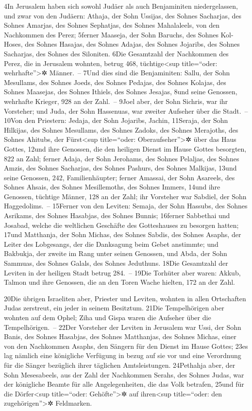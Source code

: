 4In Jerusalem haben sich sowohl Judäer als auch Benjaminiten
niedergelassen, und zwar von den Judäern: Athaja, der Sohn Ussijas, des
Sohnes Sacharjas, des Sohnes Amarjas, des Sohnes Sephatjas, des Sohnes
Mahalaleels, von den Nachkommen des Perez; 5ferner Maaseja, der Sohn
Baruchs, des Sohnes Kol-Hoses, des Sohnes Hasajas, des Sohnes Adajas,
des Sohnes Jojaribs, des Sohnes Sacharjas, des Sohnes des Siloniten.
6Die Gesamtzahl der Nachkommen des Perez, die in Jerusalem wohnten,
betrug 468, tüchtige\textless sup title=``oder: wehrhafte''\textgreater✲
Männer.~-- 7Und dies sind die Benjaminiten: Sallu, der Sohn Mesullams,
des Sohnes Joeds, des Sohnes Pedajas, des Sohnes Kolajas, des Sohnes
Maasejas, des Sohnes Ithiels, des Sohnes Jesajas, 8und seine Genossen,
wehrhafte Krieger, 928 an der Zahl.~-- 9Joel aber, der Sohn Sichris, war
ihr Vorsteher; und Juda, der Sohn Hassenuas, war zweiter Aufseher über
die Stadt.~-- 10Von den Priestern: Jedaja, der Sohn Jojaribs, Jachin,
11Seraja, der Sohn Hilkijas, des Sohnes Mesullams, des Sohnes Zadoks,
des Sohnes Merajoths, des Sohnes Ahitubs, der Fürst\textless sup
title=``oder: Oberaufseher''\textgreater✲ über das Haus Gottes, 12und
ihre Genossen, die den heiligen Dienst im Hause Gottes besorgten, 822 an
Zahl; ferner Adaja, der Sohn Jerohams, des Sohnes Pelaljas, des Sohnes
Amzis, des Sohnes Sacharjas, des Sohnes Pashurs, des Sohnes Malkijas,
13und seine Genossen, 242, Familienhäupter; ferner Amassai, der Sohn
Asareels, des Sohnes Ahsais, des Sohnes Mesillemoths, des Sohnes Immers,
14und ihre Genossen, tüchtige Männer, 128 an der Zahl; ihr Vorsteher war
Sabdiel, der Sohn Haggedolims.~-- 15Ferner von den Leviten: Semaja, der
Sohn Hassubs, des Sohnes Asrikams, des Sohnes Hasabjas, des Sohnes
Bunnis; 16ferner Sabbethai und Josabad, welche die weltlichen Geschäfte
des Gotteshauses zu besorgen hatten; 17und Matthanja, der Sohn Michas,
des Sohnes Sabdis, des Sohnes Asaphs, der Leiter des Lobgesangs, der die
Danksagung beim Gebet anstimmte; und Bakbukja, der zweite im Rang unter
seinen Genossen, und Abda, der Sohn Sammuas, des Sohnes Galals, des
Sohnes Jeduthuns. 18Die Gesamtzahl der Leviten in der heiligen Stadt
betrug 284.~-- 19Die Torhüter aber waren: Akkub, Talmon und ihre
Genossen, die an den Toren Wache hielten, 172 an der Zahl.

20Die übrigen Israeliten aber, Priester und Leviten, wohnten in allen
Ortschaften Judas zerstreut, ein jeder in seinem Besitztum. 21Die
Tempelhörigen aber wohnten auf dem Ophel; Ziha und Gispa waren die
Aufseher über die Tempelhörigen.~-- 22Der Vorsteher der Leviten in
Jerusalem war Ussi, der Sohn Banis, des Sohnes Hasabjas, des Sohnes
Matthanjas, des Sohnes Michas, einer von den Nachkommen Asaphs, den
Sängern für den Dienst im Hause Gottes; 23es lag nämlich eine königliche
Verfügung in bezug auf sie vor und eine Verordnung für die Sänger
bezüglich ihrer täglichen Amtsleistungen. 24Pethahja aber, der Sohn
Mesesabeels, aus der Zahl der Nachkommen Serahs, des Sohnes Judas, war
der königliche Beamte für alle Angelegenheiten, die das Volk betrafen,
25und für die Dörfer\textless sup title=``oder: Gehöfte''\textgreater✲
auf ihren\textless sup title=``oder: den zugehörigen''\textgreater✲
Feldmarken.

